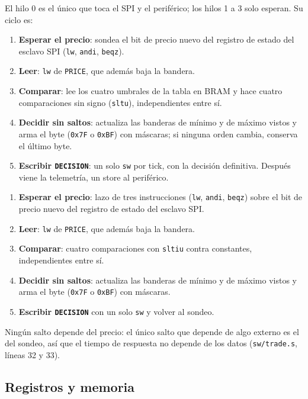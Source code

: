 \documentclass[11pt,a4paper]{article}
\newcommand{\arch}[1]{\texttt{#1}}
\begin{document}
\ifpeldanofondo
El hilo 0 es el único que toca el SPI y el periférico; los hilos 1 a 3 solo esperan. Su ciclo es:
\begin{enumerate}
  \item \textbf{Esperar el precio}: sondea el bit de precio nuevo del registro de estado del esclavo SPI (\texttt{lw}, \texttt{andi}, \texttt{beqz}).
  \item \textbf{Leer}: \texttt{lw} de \texttt{PRICE}, que además baja la bandera.
  \item \textbf{Comparar}: lee los cuatro umbrales de la tabla en BRAM y hace cuatro comparaciones sin signo (\texttt{sltu}), independientes entre sí.
  \item \textbf{Decidir sin saltos}: actualiza las banderas de mínimo y de máximo vistos y arma el byte (\texttt{0x7F} o \texttt{0xBF}) con máscaras; si ninguna orden cambia, conserva el último byte.
  \item \textbf{Escribir \texttt{DECISION}}: un solo \texttt{sw} por tick, con la decisión definitiva. Después viene la telemetría, un store al periférico.
\end{enumerate}
\else
\begin{enumerate}
  \item \textbf{Esperar el precio}: lazo de tres instrucciones (\texttt{lw}, \texttt{andi}, \texttt{beqz}) sobre el bit de precio nuevo del registro de estado del esclavo SPI.
  \item \textbf{Leer}: \texttt{lw} de \texttt{PRICE}, que además baja la bandera.
  \item \textbf{Comparar}: cuatro comparaciones con \texttt{sltiu} contra constantes, independientes entre sí.
  \item \textbf{Decidir sin saltos}: actualiza las banderas de mínimo y de máximo vistos y arma el byte (\texttt{0x7F} o \texttt{0xBF}) con máscaras.
  \item \textbf{Escribir \texttt{DECISION}} con un solo \texttt{sw} y volver al sondeo.
\end{enumerate}
\fi
Ningún salto depende del precio: el único salto que depende de algo externo es el del sondeo, así que el tiempo de respuesta no depende de los datos (\arch{sw/trade.s}, líneas 32 y 33).

\subsection{Registros y memoria}
\end{document}
